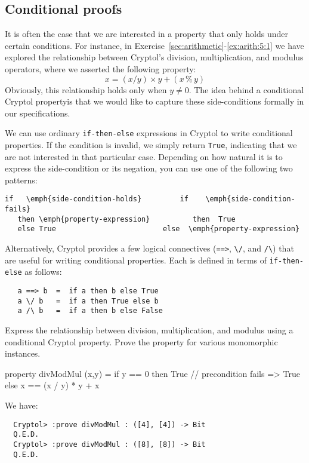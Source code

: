 \subsection{Conditional proofs}
\label{sec:condproof}

It is often the case that we are interested in a property that only
holds under certain conditions.  For instance, in
Exercise~\ref{sec:arithmetic}-\ref{ex:arith:5:1} we have explored the
relationship between Cryptol's division, multiplication, and modulus
operators, where we asserted the following
property:\indMod\indDiv\indTimes
$$
  x = (x / y) \times y + (x\,\%\,y)
$$
Obviously, this relationship holds only when $y \not= 0$. The idea
behind a conditional Cryptol property\indThmCond is that we would like
to capture these side-conditions formally in our specifications.

We can use ordinary {\tt if-then-else} expressions in Cryptol to
write conditional properties.  If the condition is invalid, we simply return
{\tt True}, indicating that we are not interested in that particular
case. Depending on how natural it is to express the side-condition or
its negation, you can use one of the following two patterns:
\begin{Verbatim}[commandchars=\\\{\}]
   if   \emph{side-condition-holds}         if    \emph{side-condition-fails}
   then \emph{property-expression}          then  True
   else True                         else  \emph{property-expression}
\end{Verbatim}

Alternatively, Cryptol provides a few logical connectives
(\texttt{==>}, \texttt{\textbackslash/}, and \texttt{/\textbackslash})
that are useful for writing conditional properties. Each is defined in
terms of \texttt{if-then-else} as follows:

\begin{Verbatim}
   a ==> b  =  if a then b else True
   a \/ b   =  if a then True else b
   a /\ b   =  if a then b else False
\end{Verbatim}

\begin{Exercise}\label{ex:cond:1}
  Express the relationship between division, multiplication, and
  modulus using a conditional Cryptol property.  Prove the property
  for various monomorphic instances.\indMod\indDiv\indTimes\indThmCond
\end{Exercise}
\begin{Answer}
\begin{code}
  property divModMul (x,y) = if y == 0
                             then True   // precondition fails => True
                             else x == (x / y) * y + x %
\end{code}
We have:
\begin{Verbatim}
  Cryptol> :prove divModMul : ([4], [4]) -> Bit
  Q.E.D.
  Cryptol> :prove divModMul : ([8], [8]) -> Bit
  Q.E.D.
\end{Verbatim}
\end{Answer}

